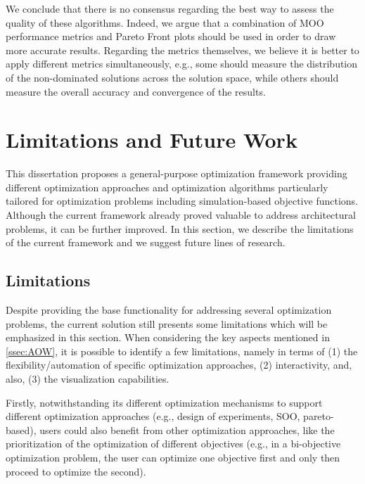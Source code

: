  We conclude that there is no consensus regarding
 the best way to assess the quality of these algorithms. Indeed, we argue that a
 combination of MOO performance metrics and Pareto Front plots should be used
 in order to draw more accurate results. Regarding the metrics themselves, we
 believe it is better to apply different metrics simultaneously, e.g., some should
 measure the distribution of the non-dominated solutions across the solution space,
 while others should measure the overall accuracy and convergence of the results.
 


\section{Limitations and Future Work}

This dissertation proposes a general-purpose optimization framework providing different optimization approaches and optimization algorithms particularly tailored for optimization problems including simulation-based objective functions. Although the current framework already proved valuable to address architectural problems, it can be further improved. In this section, we describe the limitations of the current framework and we suggest future lines of research.

\subsection{Limitations}

Despite providing the base functionality for addressing several optimization problems, the current solution still presents some limitations which will be emphasized in this section. When considering the key aspects mentioned in \cref{ssec:AOW}, it is possible to identify a few limitations, namely in terms of (1) the flexibility/automation of specific optimization approaches, (2) interactivity, and, also, (3) the visualization capabilities.

Firstly, notwithstanding its different optimization mechanisms to support different optimization approaches (e.g., design of experiments, \ac{SOO}, pareto-based), users could also benefit from other optimization approaches, like the prioritization of the optimization of different objectives (e.g., in a bi-objective optimization problem, the user can optimize one objective first and only then proceed to optimize the second). 

